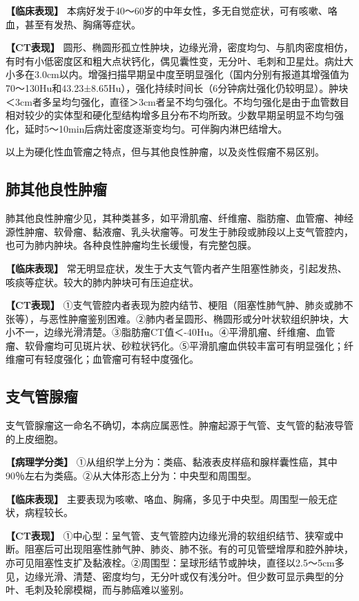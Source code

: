 \textbf{【临床表现】}
本病好发于40～60岁的中年女性，多无自觉症状，可有咳嗽、咯血，甚至有发热、胸痛等症状。

\textbf{【CT表现】}
圆形、椭圆形孤立性肿块，边缘光滑，密度均匀、与肌肉密度相仿，有时有小低密度区和粗大点状钙化，偶见囊性变，无分叶、毛刺和卫星灶。病灶大小多在3.0cm以内。增强扫描早期呈中度至明显强化（国内分别有报道其增强值为70～130Hu和43.23±8.65Hu），强化持续时间长（6分钟病灶强化仍较明显）。肿块＜3cm者多呈均匀强化，直径＞3cm者呈不均匀强化。不均匀强化是由于血管数目相对较少的实体型和硬化型结构增多且分布不均所致。少数早期呈明显不均匀强化，延时5～10min后病灶密度逐渐变均匀。可伴胸内淋巴结增大。

以上为硬化性血管瘤之特点，但与其他良性肿瘤，以及炎性假瘤不易区别。

\subsection{肺其他良性肿瘤}

肺其他良性肿瘤少见，其种类甚多，如平滑肌瘤、纤维瘤、脂肪瘤、血管瘤、神经源性肿瘤、软骨瘤、黏液瘤、乳头状瘤等。可发生于肺段或肺段以上支气管腔内，也可为肺内肿块。各种良性肿瘤均生长缓慢，有完整包膜。

\textbf{【临床表现】}
常无明显症状，发生于大支气管内者产生阻塞性肺炎，引起发热、咳痰等症状。较大的肺内肿块可有压迫症状。

\textbf{【CT表现】}
①支气管腔内者表现为腔内结节、梗阻（阻塞性肺气肿、肺炎或肺不张等），与恶性肿瘤鉴别困难。②肺内者呈圆形、椭圆形或分叶状软组织肿块，大小不一，边缘光滑清楚。③脂肪瘤CT值＜-40Hu。④平滑肌瘤、纤维瘤、血管瘤、软骨瘤均可见斑片状、砂粒状钙化。⑤平滑肌瘤血供较丰富可有明显强化；纤维瘤可有轻度强化；血管瘤可有轻中度强化。

\subsection{支气管腺瘤}

支气管腺瘤这一命名不确切，本病应属恶性。肿瘤起源于气管、支气管的黏液导管的上皮细胞。

\textbf{【病理学分类】}
①从组织学上分为：类癌、黏液表皮样癌和腺样囊性癌，其中90％左右为类癌。②从大体形态上分为：中央型和周围型。

\textbf{【临床表现】}
主要表现为咳嗽、咯血、胸痛，多见于中央型。周围型一般无症状，病程较长。

\textbf{【CT表现】}
①中心型：呈气管、支气管腔内边缘光滑的软组织结节、狭窄或中断。阻塞后可出现阻塞性肺气肿、肺炎、肺不张。有的可见管壁增厚和腔外肿块，亦可见阻塞性支扩及黏液栓。②周围型：呈球形结节或肿块，直径以2.5～5cm多见，边缘光滑、清楚、密度均匀，无分叶或仅有浅分叶。但少数可显示典型的分叶、毛刺及轮廓模糊，而与肺癌难以鉴别。

